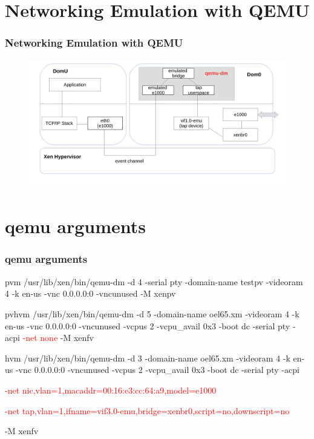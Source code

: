 \documentclass[aspectratio=169]{beamer}
\begin{document}

\section{Networking Emulation with QEMU}
\begin{frame}
\frametitle{Networking Emulation with QEMU}
\begin{figure}
\includegraphics[width=1.0\linewidth]{figures/qemu.pdf}
\end{figure}
\end{frame}


\section{qemu arguments}
\begin{frame}
\frametitle{qemu arguments}
\begin{block}{pvm}
/usr/lib/xen/bin/qemu-dm -d 4 -serial pty -domain-name testpv -videoram 4 -k en-us -vnc 0.0.0.0:0 -vncunused -M xenpv
\end{block}
\begin{block}{pvhvm}
/usr/lib/xen/bin/qemu-dm -d 5 -domain-name oel65.xm -videoram 4 -k en-us -vnc 0.0.0.0:0 -vncunused -vcpus 2 -vcpu\_avail 0x3 -boot dc -serial pty -acpi \textcolor{red}{-net none} -M xenfv
\end{block}
\begin{block}{hvm}
/usr/lib/xen/bin/qemu-dm -d 3 -domain-name oel65.xm -videoram 4 -k en-us -vnc 0.0.0.0:0 -vncunused -vcpus 2 -vcpu\_avail 0x3 -boot dc -serial pty -acpi

\textcolor{red}{-net nic,vlan=1,macaddr=00:16:e3:cc:64:a9,model=e1000}

\textcolor{red}{-net tap,vlan=1,ifname=vif3.0-emu,bridge=xenbr0,script=no,downscript=no}

-M xenfv
\end{block}
\end{frame}
\end{document}
